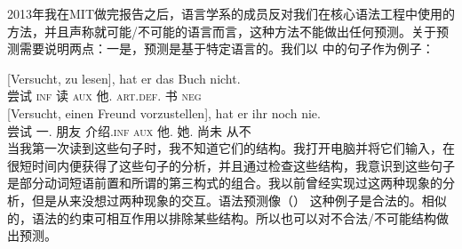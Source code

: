2013年我在MIT做完报告之后，语言学系的成员反对我们在核心语法工程中使用的方法，并且声称就可能/不可能的语言而言，这种方法不能做出任何预测。关于预测需要说明两点：一是，预测是基于特定语言的。我们以 \citet{Netter91}中的句子作为例子：

\eal
\ex 
\gll {}[Versucht, zu lesen], hat er das Buch nicht.\\
       \spacebr{}尝试 \textsc{inf} 读 \textsc{aux} 他.\nom{} \textsc{art}.\textsc{def}.\acc{} 书 \textsc{neg}\\
\ex 
\gll {}[Versucht, einen Freund vorzustellen], hat er ihr noch nie.\\
       \spacebr{}尝试 一.\acc{} 朋友 介绍.\textsc{inf} \textsc{aux} 他.\nom{} 她.\dat{} 尚未 从不\\
\zl
当我第一次读到这些句子时，我不知道它们的结构。我打开电脑并将它们输入，在很短时间内便获得了这些句子的分析，并且通过检查这些结构，我意识到这些句子是部分动词短语前置和所谓的第三构式的组合\citep[]{Mueller99a}。我以前曾经实现过这两种现象的分析，但是从来没想过两种现象的交互。语法预测像（） 这种例子是合法的。相似的，语法的约束可相互作用以排除某些结构。所以也可以对不合法/不可能结构做出预测。

